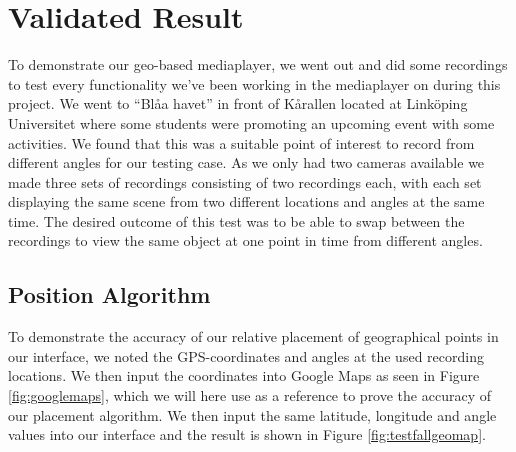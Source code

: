 \documentclass[9pt,a4paper]{acmproc}
\begin{document}
\section{Validated Result}




To demonstrate our geo-based mediaplayer, we went out and did some recordings to test every functionality we’ve been working in the mediaplayer on during this project. We went to “Blåa havet” in front of Kårallen located at Linköping Universitet where some students were promoting an upcoming event with some activities. We found that this was a suitable point of interest to record from different angles for our testing case. As we only had two cameras available we made three sets of recordings consisting of two recordings each, with each set displaying the same scene from two different locations and angles at the same time. The desired outcome of this test was to be able to swap between the recordings to view the same object at one point in time from different angles.


\subsection{Position Algorithm}
To demonstrate the accuracy of our relative placement of geographical points in our interface, we noted the GPS-coordinates and angles at the used recording locations. We then input the coordinates into Google Maps as seen in Figure \ref{fig:googlemaps}, which we will here use as a reference to prove the accuracy of our placement algorithm. We then input the same latitude, longitude and angle values into our interface and the result is shown in Figure \ref{fig:testfallgeomap}.
\end{document}
